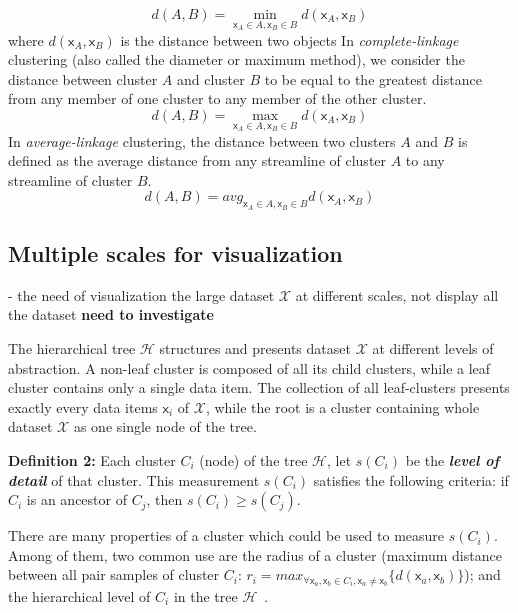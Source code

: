 \begin{equation}
\label{eq:distance_single_linkage}
d(A, B) = \min_{\mathsf{x}_A \in {A},\mathsf{x}_B \in {B}} d(\mathsf{x}_A,\mathsf{x}_B)
\end{equation}
where $d(\mathsf{x}_A,\mathsf{x}_B)$ is the distance between two objects
In \emph{complete-linkage} clustering (also called the diameter or maximum method), we consider the distance between cluster $A$ and cluster $B$ to be equal to the greatest distance from any member of one cluster to any member of the other cluster.
\begin{equation}
\label{eq:distance_complete_linkage}
d(A, B) = \max_{\mathsf{x}_A \in {A},\mathsf{x}_B \in {B}} d(\mathsf{x}_A,\mathsf{x}_B)
\end{equation}
In \emph{average-linkage} clustering, the distance between two clusters $A$ and $B$ is defined as the average distance from any streamline of cluster $A$ to any streamline of cluster $B$.
\begin{equation}
\label{eq:distance_average_linkage}
d(A, B) = avg_{\mathsf{x}_A \in {A},\mathsf{x}_B \in {B}} d(\mathsf{x}_A,\mathsf{x}_B)
\end{equation}

\subsection{Multiple scales for visualization}
\label{subsec:multiple_scales}
- the need of visualization the large dataset $\mathcal{X}$ at different scales, not display all the dataset \textbf{need to investigate}

The hierarchical tree $\mathcal{H}$ structures and presents dataset $\mathcal{X}$ at different levels of abstraction. A non-leaf cluster is composed of all its child clusters, while a leaf cluster contains only a single data item. The collection of all leaf-clusters presents exactly every data items $\mathsf{x}_i$ of $\mathcal{X}$, while the root is a cluster containing whole dataset $\mathcal{X}$ as one single node of the tree.

\textbf{Definition 2:} Each cluster $C_i$ (node) of the tree $\mathcal{H}$, let $s(C_i)$ be the \textbf{\textit{level of detail}} of that cluster. This measurement $s(C_i)$ satisfies the following criteria: if $C_i$ is an ancestor of $C_j$, then $s(C_i) \geq s(C_j)$. 

There are many properties of a cluster which could be used to measure $s(C_i)$. Among of them, two common use are the radius of a cluster (maximum distance between all pair samples of cluster $C_i$: $r_i = max_{\forall \mathsf{x}_a, \mathsf{x}_b
 \in C_i, \mathsf{x}_a \neq \mathsf{x}_b} \{d(\mathsf{x}_a,\mathsf{x}_b)\}$); and the hierarchical level of $C_i$ in the tree $\mathcal{H}$~\cite{yang2003interactive}.

